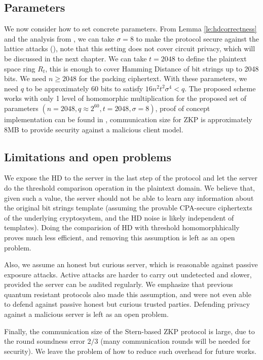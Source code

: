 \subsection{Parameters}
\label{sec:parameters}
We now consider how to set concrete parameters. From Lemma
\ref{le:hdcorrectness} and the analysis from \cite{naehrig2011can}, we can take
\(\sigma = 8\) to make the protocol secure against the lattice attacks
(\cite{micciancio2008lattice}), note that this setting does not cover circuit
privacy, which will be discussed in the next chapter. We can take \(t = 2048\)
to define the plaintext space ring \(R_{t}\), this is enough to cover Hamming
Distance of bit strings up to 2048 bits. We need \(n \geq 2048\) for the packing
ciphertext. With these parameters, we need \(q\) to be approximately 60 bits to
satisfy \(16n^{2}t^{2}\sigma^{4} < q\).  The proposed scheme works with only 1
level of homomorphic multiplication for the proposed set of parameters
$(n = 2048, q \approx 2^{60}, t = 2048, \sigma = 8)$, proof of concept
implementation can be found in \cite{rimrimrq38:online}, communication size for
ZKP is approximately 8MB to provide security against a malicious client model.

\subsection{Limitations and open problems}
\label{sec:limitations}
We expose the HD to the server in the last step of the protocol and let the server do the threshold comparison
operation in the plaintext domain. We believe that, given such a value, the server should not be able to learn any
information about the original bit strings template (assuming the provable CPA-secure ciphertexts of the underlying
cryptosystem, and the HD noise is likely independent of templates). Doing the comparision of HD with threshold
homomorphhically proves much less efficient, and removing this assumption is left as an open problem.

Also, we assume an honest but curious server, which is reasonable against passive exposure attacks. Active attacks are
harder to carry out undetected and slower, provided the server can be audited regularly. We emphasize that previous quantum
resistant protocols also made this assumption, and were not even able to defend against passive honest but curious trusted
parties. Defending privacy against a malicious server is left as an open problem.

Finally, the communication size of the Stern-based ZKP protocol is large, due to the round soundness error \(2/3\) (many
communication rounds will be needed for security). We leave the problem of how to reduce such overhead for future works.

